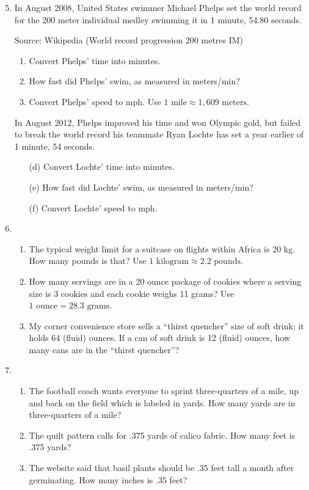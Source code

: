 \begin{enumerate} 
\setcounter{enumi}{4}

\item In August 2008, United States swimmer Michael Phelps set the world record for the 200 meter individual medley swimming it in 1 minute, 54.80 seconds. 

 \hfill \begin{footnotesize} Source:  Wikipedia (World record progression 200 metres IM)  \end{footnotesize}
\begin{enumerate}
\item Convert Phelps' time into minutes.  
\item How fast did Phelps' swim, as measured in meters/min? 
\item Convert Phelps' speed to mph.   Use $1 \text{ mile} \approx {1,609} \text{ meters}$.
\end{enumerate}

In August 2012, Phelps improved his time and won Olympic gold, but failed to break the world record his teammate Ryan Lochte has set a year earlier of 1 minute, 54 seconds.
\begin{enumerate}
\item [(d)] Convert Lochte' time into minutes.  
\item [(e)]  How fast did Lochte' swim, as measured in meters/min?  
\item [(f)] Convert Lochte' speed to mph.
\end{enumerate}

\item \begin{enumerate}
\item The typical weight limit for a suitcase on flights within Africa is 20 kg.  How many pounds is that? Use $1 \text{ kilogram} \approx 2.2 \text{ pounds}$.
\item How many servings are in a 20 ounce package of cookies where a serving size is 3 cookies and each cookie weighs 11 grams?  Use $1 \text{ ounce} = 28.3 \text{ grams}$.
\item My corner convenience store sells a ``thirst quencher'' size of soft drink; it holds 64 (fluid) ounces.  If a can of soft drink is 12 (fluid) ounces, how many cans are in the ``thirst quencher''?
\end{enumerate}

\item \begin{enumerate}
\item The football coach wants everyone to sprint three-quarters of a mile, up and back on the field which is labeled in yards.  How many yards are in three-quarters of a mile?
\item The quilt pattern calls for .375 yards of calico fabric. How many feet is .375 yards?
\item The website said that basil plants should be .35 feet tall a month after germinating.  How many inches is .35 feet?
\end{enumerate}


\end{enumerate}

